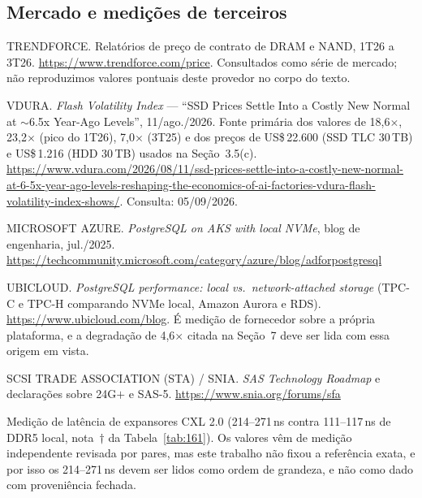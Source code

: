 \documentclass[11pt,a4paper]{article}
\begin{document}
\subsection*{Mercado e medições de terceiros}
\begin{enumerate}[label={[\arabic*]},leftmargin=*,start=28]
\item TRENDFORCE. Relatórios de preço de contrato de DRAM e NAND, 1T26 a 3T26.
      \url{https://www.trendforce.com/price}. Consultados como série de mercado; não reproduzimos
      valores pontuais deste provedor no corpo do texto.
\item VDURA. \emph{Flash Volatility Index} --- ``SSD Prices Settle Into a Costly New Normal at
      $\sim$6.5x Year-Ago Levels'', 11/ago./2026. Fonte primária dos valores de 18,6$\times$,
      23,2$\times$ (pico do 1T26), 7,0$\times$ (3T25) e dos preços de US\$\,22.600 (SSD TLC
      30\,TB) e US\$\,1.216 (HDD 30\,TB) usados na Seção~3.5(c).
      \url{https://www.vdura.com/2026/08/11/ssd-prices-settle-into-a-costly-new-normal-at-6-5x-year-ago-levels-reshaping-the-economics-of-ai-factories-vdura-flash-volatility-index-shows/}.
      Consulta: 05/09/2026.
\item MICROSOFT AZURE. \emph{PostgreSQL on AKS with local NVMe}, blog de engenharia,
      jul./2025. \url{https://techcommunity.microsoft.com/category/azure/blog/adforpostgresql}
\item UBICLOUD. \emph{PostgreSQL performance: local vs.\ network-attached storage} (TPC-C e
      TPC-H comparando NVMe local, Amazon Aurora e RDS). \url{https://www.ubicloud.com/blog}. É
      medição de fornecedor sobre a própria plataforma, e a degradação de 4,6$\times$ citada na
      Seção~7 deve ser lida com essa origem em vista.
\item SCSI TRADE ASSOCIATION (STA) / SNIA. \emph{SAS Technology Roadmap} e declarações
      sobre 24G$+$ e SAS-5. \url{https://www.snia.org/forums/sfa}

\item Medição de latência de expansores CXL 2.0 (214--271\,ns contra 111--117\,ns de DDR5
      local, nota~$\dagger$ da Tabela~\ref{tab:161}). Os valores vêm de medição independente
      revisada por pares, mas este trabalho não fixou a referência exata, e por isso os
      214--271\,ns devem ser lidos como ordem de grandeza, e não como dado com proveniência
      fechada.
\end{enumerate}
\endgroup

\newpage
\end{document}
